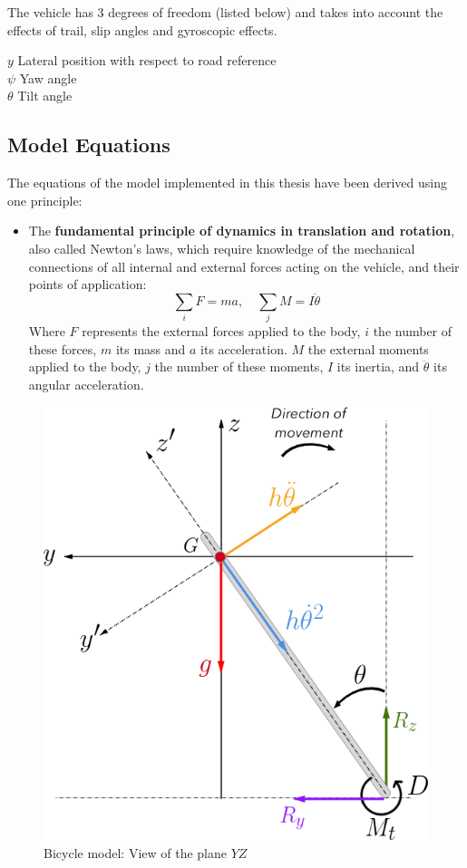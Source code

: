 The vehicle has 3 degrees of freedom (listed below) and takes into account the effects of trail, slip angles and gyroscopic effects.

$y$ \quad Lateral position with respect to road reference \\
$\psi$ \quad Yaw angle \\ 
$\theta$ \quad Tilt angle \\
\subsection{Model Equations}
The equations of the model implemented in this thesis have been derived using one principle:

\begin{itemize}
	\begin{itemize}
	\item The \textbf{fundamental principle of dynamics in translation and rotation}, also called Newton's laws, which require knowledge of the mechanical connections of all internal and external forces acting on the vehicle, and their points of application:
	\[\sum_{i} F=ma,\quad \sum_{j} M=I\ddot{\theta}\]
	Where $F$ represents the external forces applied to the body, $i$ the number of these forces, $m$ its mass and $a$ its acceleration. $M$ the external moments applied to the body, $j$ the number of these moments, $I$ its inertia, and $\ddot{\theta}$ its angular acceleration.
	\end{itemize}
\end{itemize}
\begin{figure}
	\centering
	\includegraphics[width=0.85\linewidth]{figs/02/yz2}
	\caption{Bicycle model: View of the plane $YZ$}
	\label{yz}
\end{figure}
